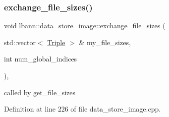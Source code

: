 \subsubsection{\texorpdfstring{exchange\+\_\+file\+\_\+sizes()}{exchange\_file\_sizes()}}
{\footnotesize\ttfamily void lbann\+::data\+\_\+store\+\_\+image\+::exchange\+\_\+file\+\_\+sizes (\begin{DoxyParamCaption}\item[{std\+::vector$<$ \hyperlink{structlbann_1_1data__store__image_1_1Triple}{Triple} $>$ \&}]{my\+\_\+file\+\_\+sizes,  }\item[{int}]{num\+\_\+global\+\_\+indices }\end{DoxyParamCaption})\hspace{0.3cm}{\ttfamily [protected]}, {\ttfamily [virtual]}}



called by get\+\_\+file\+\_\+sizes 



Definition at line 226 of file data\+\_\+store\+\_\+image.\+cpp.



